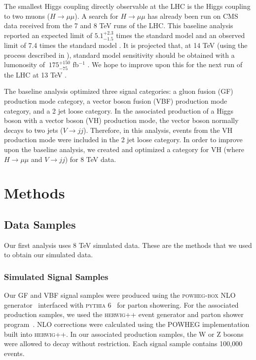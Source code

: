 \documentclass[12pt]{article}
\begin{document}
The smallest Higgs coupling directly observable at the LHC is the Higgs coupling to two muons ($H\rightarrow \mu \mu$). 
A search for $H\rightarrow \mu \mu$ has already been run on CMS data received from the 7 and 8 TeV runs of the LHC. 
This baseline analysis reported an expected limit of $5.1^{+2.3}_{-1.5}$ times the standard model
and an observed limit of 7.4 times the standard model \cite{hmumuPap}. It is projected that, 
at 14 TeV (using the process described in \cite{snow}), standard model 
sensitivity should be obtained with a lumonosity of $~175^{+150}_{-75}$ fb$^{-1}$ \cite{hmumuPap}. 
We hope to improve upon this for the next run of the LHC at 13 TeV \cite{AN2012_459}. 

The baseline analysis optimized three signal categories: a gluon fusion (GF) production mode category, 
a vector boson fusion (VBF) production mode category, and a 2 jet loose category. 
In the associated production of a Higgs boson with a vector boson (VH) production mode, 
the vector boson normally decays to two jets ($V\rightarrow jj$). Therefore, in this analysis, events from the VH production mode
were included in the 2 jet loose category. In order to improve upon the baseline analysis, we created and optimized 
a category for VH (where $H\rightarrow \mu \mu$ and $V\rightarrow jj$) for 8 TeV data.

\section{Methods}

\subsection{Data Samples}

Our first analysis uses 8 TeV simulated data. These are the methods that we used to obtain our simulated data.

\subsubsection{Simulated Signal Samples}

Our GF and VBF signal samples were produced using the \textsc{powheg-box} NLO generator~\cite{powheg1,powheg2,powheg3} 
interfaced with \textsc{pythia} 6~\cite{pythia} for parton showering.
For the associated production samples, we used the \textsc{herwig}++ event generator and 
parton shower program~\cite{herwigpp}.  NLO corrections were calculated using the 
POWHEG implementation built into \textsc{herwig}++. 
In our associated production samples, the W or Z bosons were allowed to decay without restriction.
Each signal sample contains 100,000 events.
\end{document}
